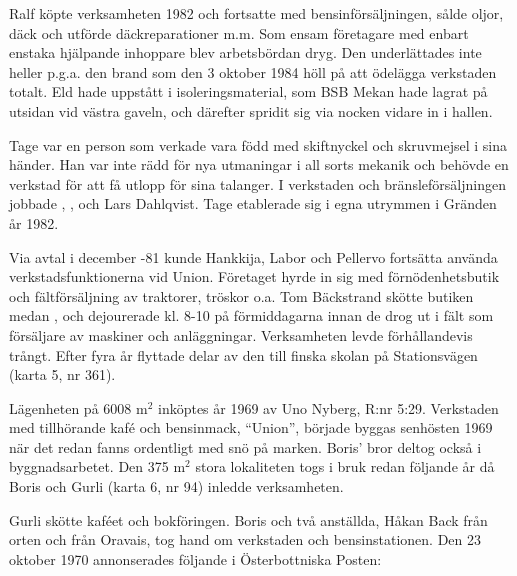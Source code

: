 Ralf köpte verksamheten 1982 och fortsatte med bensinförsäljningen, sålde oljor, däck och utförde däckreparationer m.m. Som ensam företagare med enbart enstaka hjälpande inhoppare blev arbetsbördan dryg.	Den underlättades inte heller p.g.a. den brand som den 3 oktober 1984 höll på att ödelägga verkstaden totalt. Eld hade uppstått i isoleringsmaterial, som BSB Mekan hade lagrat på utsidan vid västra	gaveln, och därefter spridit sig via nocken vidare in i hallen.


Tage var en person som verkade vara född med skiftnyckel och skruvmejsel i sina händer. Han var inte rädd för nya utmaningar i all sorts mekanik och behövde en verkstad för att få utlopp för sina talanger. I verkstaden och bränsleförsäljningen jobbade , ,  och Lars Dahlqvist. Tage etablerade sig i egna 	utrymmen i Gränden år 1982.


Via avtal i december -81 kunde Hankkija, Labor och Pellervo fortsätta använda verkstadsfunktionerna vid Union. Företaget hyrde in sig med förnödenhetsbutik och fältförsäljning av traktorer, tröskor o.a. Tom Bäckstrand skötte butiken medan ,  och  dejourerade kl. 8-10 på förmiddagarna innan de drog ut i fält som försäljare av maskiner och anläggningar. Verksamheten levde förhållandevis trångt. Efter fyra år flyttade delar av den till finska skolan på Stationsvägen (karta 5,  nr 361).




Lägenheten på 6008 m$^2$ inköptes år 1969 av Uno Nyberg, R:nr 5:29. Verkstaden med tillhörande kafé och bensinmack, ``Union'', började	byggas senhösten 1969 när det redan fanns ordentligt med snö på marken. Boris' bror  deltog också i byggnadsarbetet. Den 375 m$^2$ stora lokaliteten togs i bruk redan följande år då Boris och Gurli (karta 6, nr 94) inledde verksamheten.

Gurli skötte kaféet och bokföringen. Boris och två anställda, Håkan Back från orten och  från Oravais, tog hand om verkstaden och bensinstationen. Den 23 oktober 1970 annonserades följande i Österbottniska Posten:


